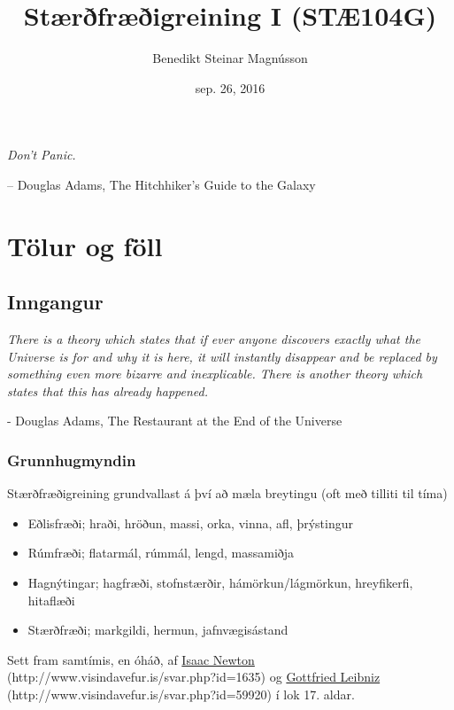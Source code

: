 \documentclass[a4paper,10pt,icelandic]{sphinxmanual}
\title{Stærðfræðigreining I (STÆ104G)}
\date{sep. 26, 2016}
\author{Benedikt Steinar Magnússon}
\begin{document}
\maketitle
\tableofcontents
\emph{Don't Panic.}

-- Douglas Adams, The Hitchhiker's Guide to the Galaxy
\label{index::doc}




\chapter{Tölur og föll}
\label{kafli01:tolur-og-foll}\label{kafli01:staerfraeigreining-i-stae104g-haskoli-islands-haust-2016}\label{kafli01::doc}

\section{Inngangur}
\label{kafli01:inngangur}
\emph{There is a theory which states that if ever anyone discovers exactly what the Universe is for and why it is here, it will instantly disappear and be replaced by something even more bizarre and inexplicable.
There is another theory which states that this has already happened.}

- Douglas Adams, The Restaurant at the End of the Universe


\subsection{Grunnhugmyndin}
\label{kafli01:grunnhugmyndin}
Stærðfræðigreining grundvallast á því að mæla breytingu (oft með tilliti
til tíma)
\begin{itemize}
\item {} 
Eðlisfræði; hraði, hröðun, massi, orka, vinna, afl, þrýstingur

\item {} 
Rúmfræði; flatarmál, rúmmál, lengd, massamiðja

\item {} 
Hagnýtingar; hagfræði, stofnstærðir, hámörkun/lágmörkun, hreyfikerfi, hitaflæði

\item {} 
Stærðfræði; markgildi, hermun, jafnvægisástand

\end{itemize}

Sett fram samtímis, en óháð, af
\href{http://www.visindavefur.is/svar.php?id=1635}{Isaac Newton} (http://www.visindavefur.is/svar.php?id=1635) og
\href{http://www.visindavefur.is/svar.php?id=59920}{Gottfried Leibniz} (http://www.visindavefur.is/svar.php?id=59920) í lok 17. aldar.
\end{document}
